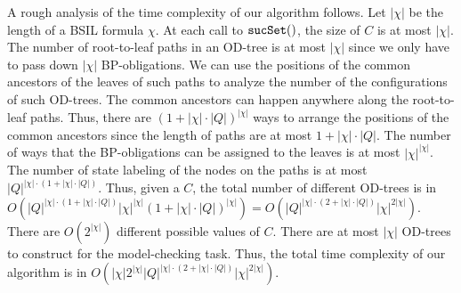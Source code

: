 A rough analysis of the time complexity of our algorithm follows. 
Let $|\chi|$ be the length of a BSIL formula $\chi$. 
At each call to $\mbox{\tt sucSet}()$, the size of $C$ is at most $|\chi|$.  
The number of root-to-leaf paths in an OD-tree is at most
$|\chi|$ since we only have to pass down $|\chi|$ BP-obligations. 
We can use the positions of the common ancestors of the leaves of 
such paths to analyze the number of the configurations of 
such OD-trees. 
The common ancestors can happen anywhere along the root-to-leaf paths. 
Thus, there are $(1+|\chi|\cdot |Q|)^{|\chi|}$ ways to 
arrange the positions of the common ancestors since 
the length of paths are at most $1+|\chi|\cdot |Q|$.  
The number of ways that the BP-obligations can be assigned to the leaves 
is at most $|\chi|^{|\chi|}$.  
The number of state labeling of the nodes on the paths 
is at most $|Q|^{|\chi|\cdot(1+|\chi|\cdot|Q|)}$.  
Thus, given a $C$, the total number of different OD-trees 
is in
$O(|Q|^{|\chi|\cdot(1+|\chi|\cdot|Q|)}
|\chi|^{|\chi|}
(1+|\chi|\cdot |Q|)^{|\chi|})=
O(|Q|^{|\chi|\cdot(2+|\chi|\cdot|Q|)}|\chi|^{2|\chi|})$.  
There are $O(2^{|\chi|})$ different possible values of $C$.  
There are at most $|\chi|$ OD-trees to construct for 
the model-checking task. 
Thus, the total time complexity of our algorithm is in
$O(|\chi|2^{|\chi|}|Q|^{|\chi|\cdot(2+|\chi|\cdot|Q|)}|\chi|^{2|\chi|})$.    


